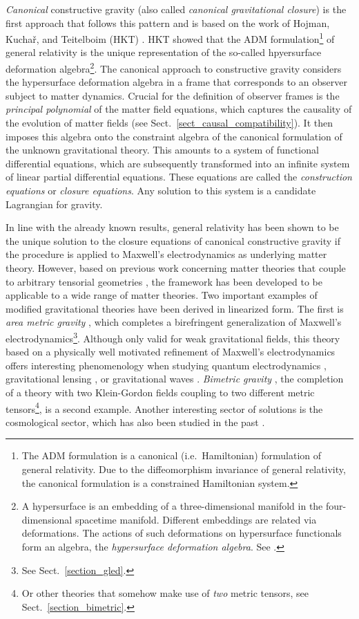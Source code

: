 \emph{Canonical} constructive gravity (also called \emph{canonical gravitational closure}) \cite{Giesel_2012,Schuller_2014,Witte_2014,D_ll_2018} is the first approach that follows this pattern and is based on the work of Hojman, Kucha\v{r}, and Teitelboim (HKT) \cite{Hojman_1976}. HKT showed that the ADM formulation\footnote{The ADM formulation \cite{Arnowitt_1960} is a canonical (i.e.~Hamiltonian) formulation of general relativity. Due to the diffeomorphism invariance of general relativity, the canonical formulation is a constrained Hamiltonian system.} of general relativity is the unique representation of the so-called hpyersurface deformation algebra\footnote{A hypersurface is an embedding of a three-dimensional manifold in the four-dimensional spacetime manifold. Different embeddings are related via deformations. The actions of such deformations on hypersurface functionals form an algebra, the \emph{hypersurface deformation algebra}. See \cite{Hojman_1976}.}. The canonical approach to constructive gravity considers the hypersurface deformation algebra in a frame that corresponds to an observer subject to matter dynamics. Crucial for the definition of observer frames is the \emph{principal polynomial} of the matter field equations, which captures the causality of the evolution of matter fields (see Sect.~\ref{sect_causal_compatibility}). It then imposes this algebra onto the constraint algebra of the canonical formulation of the unknown gravitational theory. This amounts to a system of functional differential equations, which are subsequently transformed into an infinite system of linear partial differential equations. These equations are called the \emph{construction equations} or \emph{closure equations}. Any solution to this system is a candidate Lagrangian for gravity.

In line with the already known results, general relativity has been shown to be the unique solution to the closure equations of canonical constructive gravity if the procedure is applied to Maxwell's electrodynamics as underlying matter theory. \cite{} However, based on previous work concerning matter theories that couple to arbitrary tensorial geometries \cite{R_tzel_2011,Rivera_2012}, the framework has been developed to be applicable to a wide range of matter theories. Two important examples of modified gravitational theories have been derived in linearized form. The first is \emph{area metric gravity} \cite{Alex_2020_2}, which completes a birefringent generalization of Maxwell's electrodynamics\footnote{See Sect.~\ref{section_gled}.}. Although only valid for weak gravitational fields, this theory based on a physically well motivated refinement of Maxwell's electrodynamics offers interesting phenomenology when studying quantum electrodynamics \cite{GrosseHolz_2017}, gravitational lensing \cite{Schuller_2017}, or gravitational waves \cite{Alex_2019}. \emph{Bimetric gravity} \cite{Wierzba_2018,Beier_2018}, the completion of a theory with two Klein-Gordon fields coupling to two different metric tensors\footnote{Or other theories that somehow make use of \emph{two} metric tensors, see Sect.~\ref{section_bimetric}.}, is a second example. Another interesting sector of solutions is the cosmological sector, which has also been studied in the past \cite{Duell_2020}.

